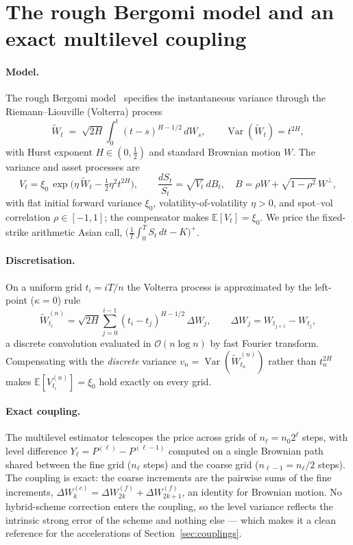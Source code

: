 \documentclass[11pt]{article}
\begin{document}
\section{The rough Bergomi model and an exact multilevel coupling}
\label{sec:model}

\paragraph{Model.}
The rough Bergomi model~\cite{bfg2016} specifies the instantaneous variance through the
Riemann--Liouville (Volterra) process
\begin{equation}
\widetilde{W}_t \;=\; \sqrt{2H}\int_0^t (t-s)^{H-1/2}\,dW_s,
\qquad \operatorname{Var}(\widetilde{W}_t)=t^{2H},
\end{equation}
with Hurst exponent $H\in(0,\tfrac12)$ and standard Brownian motion $W$. The variance and
asset processes are
\begin{equation}
V_t = \xi_0\,\exp\!\Big(\eta\,\widetilde{W}_t-\tfrac12\eta^2 t^{2H}\Big),
\qquad
\frac{dS_t}{S_t} = \sqrt{V_t}\,dB_t,
\quad B=\rho W+\sqrt{1-\rho^2}\,W^{\perp},
\end{equation}
with flat initial forward variance $\xi_0$, volatility-of-volatility $\eta>0$, and
spot--vol correlation $\rho\in[-1,1]$; the compensator makes $\mathbb{E}[V_t]=\xi_0$. We
price the fixed-strike arithmetic Asian call,
$\big(\tfrac1T\!\int_0^T S_t\,dt-K\big)^{+}$.

\paragraph{Discretisation.}
On a uniform grid $t_i=iT/n$ the Volterra process is approximated by the left-point
($\kappa=0$) rule
\begin{equation}
\widetilde{W}^{(n)}_{t_i}
=\sqrt{2H}\sum_{j=0}^{i-1} (t_i-t_j)^{H-1/2}\,\Delta W_j,
\qquad \Delta W_j = W_{t_{j+1}}-W_{t_j},
\label{eq:conv}
\end{equation}
a discrete convolution evaluated in $\mathcal{O}(n\log n)$ by fast Fourier transform.
Compensating with the \emph{discrete} variance
$v_n=\operatorname{Var}(\widetilde{W}^{(n)}_{t_n})$ rather than $t_n^{2H}$ makes
$\mathbb{E}[V^{(n)}_{t_i}]=\xi_0$ hold exactly on every grid.

\paragraph{Exact coupling.}
The multilevel estimator telescopes the price across grids of $n_\ell=n_0 2^{\ell}$ steps,
with level difference $Y_\ell=P^{(\ell)}-P^{(\ell-1)}$ computed on a single Brownian path
shared between the fine grid ($n_\ell$ steps) and the coarse grid ($n_{\ell-1}=n_\ell/2$
steps). The coupling is exact: the coarse increments are the pairwise sums of the fine
increments, $\Delta W^{(c)}_k=\Delta W^{(f)}_{2k}+\Delta W^{(f)}_{2k+1}$, an identity for
Brownian motion. No hybrid-scheme correction enters the coupling, so the level variance
reflects the intrinsic strong error of the scheme and nothing else --- which makes it a
clean reference for the accelerations of Section~\ref{sec:couplings}.
\end{document}
